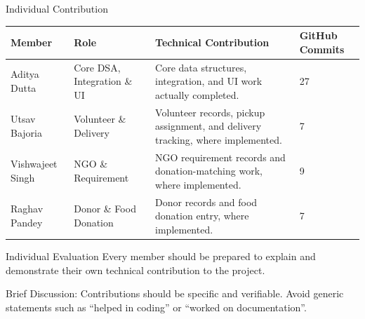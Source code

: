 \documentclass[aspectratio=169,11pt]{beamer}
\newcommand{\smallnote}[1]{%
\vspace{0.08cm}
{\scriptsize\color{GEUGrey}#1}
}
\begin{document}
\begin{frame}{Individual Contribution}

\scriptsize

\begin{center}

\renewcommand{\arraystretch}{1.35}

\begin{tabularx}{.96\textwidth}
{@{}p{2.0cm}p{2.0cm}X p{1.6cm}@{}}

\toprule
Member &
Role &
Technical Contribution &
GitHub Commits\\
\midrule

Aditya Dutta &
Core DSA, Integration \& UI &
Core data structures, integration, and UI work actually completed. &
27\\

Utsav Bajoria &
Volunteer \& Delivery &
Volunteer records, pickup assignment, and delivery tracking, where implemented. &
7\\

Vishwajeet Singh &
NGO \& Requirement &
NGO requirement records and donation-matching work, where implemented. &
9\\

Raghav Pandey &
Donor \& Food Donation &
Donor records and food donation entry, where implemented. &
7\\

\bottomrule

\end{tabularx}

\end{center}

\vspace{3mm}

\begin{block}{Individual Evaluation}
Every member should be prepared to explain and demonstrate
their own technical contribution to the project.
\end{block}

\smallnote{
Brief Discussion: Contributions should be specific and verifiable.
Avoid generic statements such as ``helped in coding'' or
``worked on documentation''.
}

\end{frame}
\end{document}
